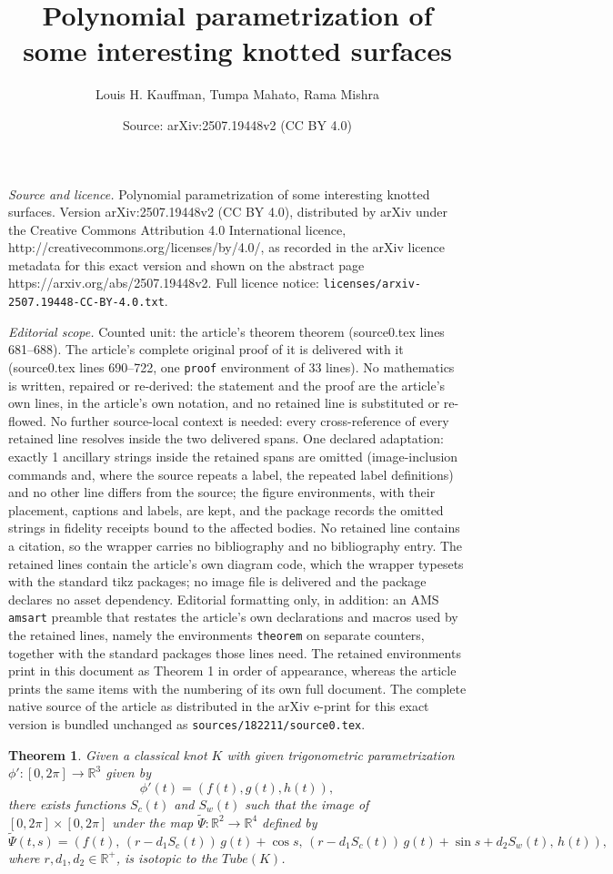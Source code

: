 \documentclass[10pt,a4paper]{amsart}
\title{Polynomial parametrization of some interesting knotted surfaces}
\author{Louis H. Kauffman, Tumpa Mahato, Rama Mishra}
\date{Source: arXiv:2507.19448v2 (CC BY 4.0)}
\newtheorem{theorem}{Theorem}
\newcommand{\LP}{\left(}
\newcommand{\R}{\mathbb R}
\newcommand{\RP}{\right)}
\begin{document}
\maketitle

\noindent\emph{Source and licence.} Polynomial parametrization of some interesting knotted surfaces. Version arXiv:2507.19448v2 (CC BY 4.0), distributed by arXiv under the Creative Commons Attribution 4.0 International licence, http://creativecommons.org/licenses/by/4.0/, as recorded in the arXiv licence metadata for this exact version and shown on the abstract page https://arxiv.org/abs/2507.19448v2. Full licence notice: \texttt{licenses/arxiv-2507.19448-CC-BY-4.0.txt}.\par\smallskip

\noindent\textit{Editorial scope.} Counted unit: the article's theorem theorem (source0.tex lines 681--688). The article's complete original proof of it is delivered with it (source0.tex lines 690--722, one \texttt{proof} environment of 33 lines). No mathematics is written, repaired or re-derived: the statement and the proof are the article's own lines, in the article's own notation, and no retained line is substituted or re-flowed.  No further source-local context is needed: every cross-reference of every retained line resolves inside the two delivered spans.  One declared adaptation: exactly 1 ancillary strings inside the retained spans are omitted (image-inclusion commands and, where the source repeats a label, the repeated label definitions) and no other line differs from the source; the figure environments, with their placement, captions and labels, are kept, and the package records the omitted strings in fidelity receipts bound to the affected bodies.  No retained line contains a citation, so the wrapper carries no bibliography and no bibliography entry.  The retained lines contain the article's own diagram code, which the wrapper typesets with the standard tikz packages; no image file is delivered and the package declares no asset dependency.  Editorial formatting only, in addition: an AMS \texttt{amsart} preamble that restates the article's own declarations and macros used by the retained lines, namely the environments \texttt{theorem} on separate counters, together with the standard packages those lines need.  The retained environments print in this document as Theorem 1 in order of appearance, whereas the article prints the same items with the numbering of its own full document.  The complete native source of the article as distributed in the arXiv e-print for this exact version is bundled unchanged as \texttt{sources/182211/source0.tex}.
\begin{theorem}
	Given a classical knot $K$ with given trigonometric  parametrization $\phi': [0,2\pi] \rightarrow \R^3$ given by
	\[\phi'(t)=\LP f(t),g(t),h(t)\RP ,\]
	there exists functions $S_{c}(t)$ and $S_{w}(t)$ such that 
	the image of $[0,2\pi]\times [0,2\pi]$ under the map $\tilde{\Psi}: \R^2 \to \R^4$ defined by
	\[\tilde{\Psi}(t,s)=\LP f(t),\,(r-d_{1}S_{c}(t))\,g(t)+\cos s,\,(r-d_{1}S_{c}(t))\,g(t)+\sin s+d_{2}S_{w}(t),\, h(t)\RP,\]
	where $r, d_{1}, d_{2} \in \R^{+}$, is isotopic to the $Tube(K)$.
\end{theorem}
\end{document}
